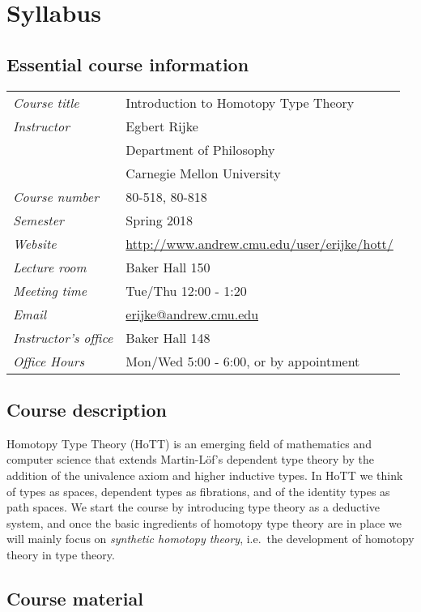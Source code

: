 \chapter{Syllabus}

\section{Essential course information}
\begin{center}
\begin{tabular}{ll}
\emph{Course title} & Introduction to Homotopy Type Theory \\
\emph{Instructor} & Egbert Rijke \\
& Department of Philosophy \\
& Carnegie Mellon University \\
\emph{Course number} & 80-518, 80-818 \\
\emph{Semester} & Spring 2018 \\
\emph{Website} & \url{http://www.andrew.cmu.edu/user/erijke/hott/} \\
\emph{Lecture room} & Baker Hall 150 \\
\emph{Meeting time} & Tue/Thu 12:00 - 1:20 \\
\emph{Email} & \href{mailto:erijke@andrew.cmu.edu}{erijke@andrew.cmu.edu} \\
\emph{Instructor's office} & Baker Hall 148 \\
\emph{Office Hours} & Mon/Wed 5:00 - 6:00, or by appointment
\end{tabular}
\end{center}

\section{Course description}
Homotopy Type Theory (HoTT) is an emerging field of mathematics and computer science that extends Martin-Löf's dependent type theory by the addition of the univalence axiom and higher inductive types. In HoTT we think of types as spaces, dependent types as fibrations, and of the identity types as path spaces. We start the course by introducing type theory as a deductive system, and once the basic ingredients of homotopy type theory are in place we will mainly focus on \emph{synthetic homotopy theory}, i.e.~the development of homotopy theory in type theory.

\section{Course material}

